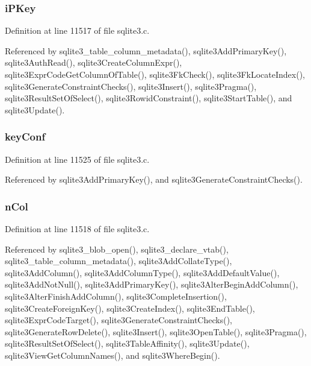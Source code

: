 \hypertarget{struct_table_a5945a7cb5671a843d71c7b87509bcd33}{}
\subsubsection[{i\+P\+Key}]{ i\+P\+Key}\label{struct_table_a5945a7cb5671a843d71c7b87509bcd33}


Definition at line 11517 of file sqlite3.\+c.



Referenced by sqlite3\+\_\+table\+\_\+column\+\_\+metadata(), sqlite3\+Add\+Primary\+Key(), sqlite3\+Auth\+Read(), sqlite3\+Create\+Column\+Expr(), sqlite3\+Expr\+Code\+Get\+Column\+Of\+Table(), sqlite3\+Fk\+Check(), sqlite3\+Fk\+Locate\+Index(), sqlite3\+Generate\+Constraint\+Checks(), sqlite3\+Insert(), sqlite3\+Pragma(), sqlite3\+Result\+Set\+Of\+Select(), sqlite3\+Rowid\+Constraint(), sqlite3\+Start\+Table(), and sqlite3\+Update().

\hypertarget{struct_table_af3fe9dbb2acd8a6e9612f31ef9840ac5}{}
\subsubsection[{key\+Conf}]{ key\+Conf}\label{struct_table_af3fe9dbb2acd8a6e9612f31ef9840ac5}


Definition at line 11525 of file sqlite3.\+c.



Referenced by sqlite3\+Add\+Primary\+Key(), and sqlite3\+Generate\+Constraint\+Checks().

\hypertarget{struct_table_ae35439b3ccd25c30078f95bf0b32b3ac}{}
\subsubsection[{n\+Col}]{ n\+Col}\label{struct_table_ae35439b3ccd25c30078f95bf0b32b3ac}


Definition at line 11518 of file sqlite3.\+c.



Referenced by sqlite3\+\_\+blob\+\_\+open(), sqlite3\+\_\+declare\+\_\+vtab(), sqlite3\+\_\+table\+\_\+column\+\_\+metadata(), sqlite3\+Add\+Collate\+Type(), sqlite3\+Add\+Column(), sqlite3\+Add\+Column\+Type(), sqlite3\+Add\+Default\+Value(), sqlite3\+Add\+Not\+Null(), sqlite3\+Add\+Primary\+Key(), sqlite3\+Alter\+Begin\+Add\+Column(), sqlite3\+Alter\+Finish\+Add\+Column(), sqlite3\+Complete\+Insertion(), sqlite3\+Create\+Foreign\+Key(), sqlite3\+Create\+Index(), sqlite3\+End\+Table(), sqlite3\+Expr\+Code\+Target(), sqlite3\+Generate\+Constraint\+Checks(), sqlite3\+Generate\+Row\+Delete(), sqlite3\+Insert(), sqlite3\+Open\+Table(), sqlite3\+Pragma(), sqlite3\+Result\+Set\+Of\+Select(), sqlite3\+Table\+Affinity(), sqlite3\+Update(), sqlite3\+View\+Get\+Column\+Names(), and sqlite3\+Where\+Begin().

